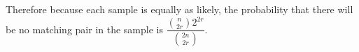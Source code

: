 \documentclass[10pt,twoside]{article}
\begin{document}
\begin{enumerate}
{    Therefore because each sample is equally as likely, the probability that there will be no matching pair in the sample is $\dfrac{\binom{n}{2r}2^{2r}}{\binom{2n}{2r}}$.}
    
    

\end{enumerate}
\end{document}
